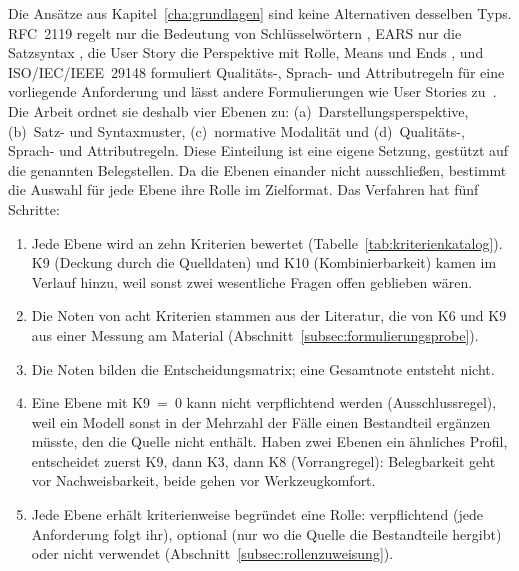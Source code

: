 \documentclass[11pt,a4paper]{report}
\begin{document}
Die Ansätze aus Kapitel~\ref{cha:grundlagen} sind keine Alternativen
desselben Typs. RFC~2119 regelt nur die Bedeutung von Schlüsselwörtern
\cite[Abschn.~1--5]{rfc2119}, EARS nur die Satzsyntax
\cite[Abschn.~4.1]{mavin2009ears}, die User Story die Perspektive mit
Rolle, Means und Ends \cite[Abschn.~2]{lucassen2016qus}, und
ISO/IEC/IEEE~29148 formuliert Qualitäts-, Sprach- und Attributregeln
für eine vorliegende Anforderung und lässt andere Formulierungen wie
User Stories zu~\cite[Abschn.~5.2.4 NOTE~2 und 5.2.5--5.2.8]{iso29148}.
Die Arbeit ordnet sie deshalb vier Ebenen zu: (a)~Darstellungsperspektive,
(b)~Satz- und Syntaxmuster, (c)~normative Modalität und
(d)~Qualitäts-, Sprach- und Attributregeln. Diese Einteilung ist eine
eigene Setzung, gestützt auf die genannten Belegstellen. Da die Ebenen
einander nicht ausschließen, bestimmt die Auswahl für jede Ebene ihre
Rolle im Zielformat. Das Verfahren hat fünf Schritte:

\begin{enumerate}
  \item Jede Ebene wird an zehn Kriterien bewertet
    (Tabelle~\ref{tab:kriterienkatalog}). K9 (Deckung durch die
    Quelldaten) und K10 (Kombinierbarkeit) kamen im Verlauf hinzu, weil
    sonst zwei wesentliche Fragen offen geblieben wären.
  \item Die Noten von acht Kriterien stammen aus der Literatur, die von
    K6 und K9 aus einer Messung am Material
    (Abschnitt~\ref{subsec:formulierungsprobe}).
  \item Die Noten bilden die Entscheidungsmatrix; eine Gesamtnote
    entsteht nicht.
  \item Eine Ebene mit K9~=~0 kann nicht verpflichtend werden
    (Ausschlussregel), weil ein Modell sonst in der Mehrzahl der Fälle
    einen Bestandteil ergänzen müsste, den die Quelle nicht enthält. Haben zwei Ebenen ein ähnliches Profil,
    entscheidet zuerst K9, dann K3, dann K8 (Vorrangregel): Belegbarkeit
    geht vor Nachweisbarkeit, beide gehen vor Werkzeugkomfort.
  \item Jede Ebene erhält kriterienweise begründet eine Rolle:
    verpflichtend (jede Anforderung folgt ihr), optional (nur wo die
    Quelle die Bestandteile hergibt) oder nicht verwendet
    (Abschnitt~\ref{subsec:rollenzuweisung}).
\end{enumerate}
\end{document}
